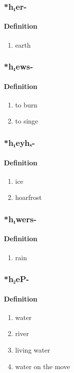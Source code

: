 \subsubsection{\**h₁er-}
\paragraph{Definition}
\begin{enumerate}
\item earth
\end{enumerate}
\subsubsection{\**h₁ews-}
\paragraph{Definition}
\begin{enumerate}
\item to burn
\item to singe
\end{enumerate}
\subsubsection{\**h₁eyhₓ-}
\paragraph{Definition}
\begin{enumerate}
\item ice
\item hoarfrost
\end{enumerate}
\subsubsection{\**h₁wers-}
\paragraph{Definition}
\begin{enumerate}
\item rain
\end{enumerate}
\subsubsection{\**h₂eP-}
\paragraph{Definition}
\begin{enumerate}
\item water
\item river
\item living water
\item water on the move
\end{enumerate}
